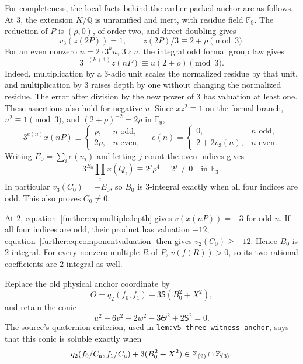 For completeness, the local facts behind the earlier packed anchor are
as follows. At $3$, the extension $K/\mathbb Q$ is unramified and inert,
with residue field $\mathbb F_9$. The reduction of $P$ is $(\rho,0)$,
of order two, and direct doubling gives
\[
 v_3(z(2P))=1,\qquad z(2P)/3\equiv2+\rho\pmod3.
\]
For an even nonzero $n=2\cdot3^ku$, $3\nmid u$, the integral odd
formal group law gives
\[
 3^{-(k+1)}z(nP)\equiv u(2+\rho)\pmod3.
\]
Indeed, multiplication by a $3$-adic unit scales the normalized residue
by that unit, and multiplication by $3$ raises depth by one without
changing the normalized residue. The error after division by the new
power of $3$ has valuation at least one. These assertions also hold for
negative $u$.
Since $xz^2\equiv1$ on the formal branch,
$u^2\equiv1\pmod3$, and $(2+\rho)^{-2}=2\rho$ in $\mathbb F_9$,
\[
 3^{e(n)}x(nP)\equiv
 \begin{cases}
 \rho,&n\text{ odd},\\
 2\rho,&n\text{ even},
 \end{cases}
 \quad
 e(n)=\begin{cases}0,&n\text{ odd},\\2+2v_3(n),&n\text{ even}.
 \end{cases}
\]
Writing $E_0=\sum_i e(n_i)$ and letting $j$ count the even indices gives
\[
 3^{E_0}\prod_i x(Q_i)\equiv2^j\rho^4=2^j\ne0
 \quad\text{in }\mathbb F_3.
\]
In particular $v_3(C_0)=-E_0$, so $B_0$ is $3$-integral exactly when
all four indices are odd. This also proves $C_0\ne0$.

At $2$, equation~\eqref{further:eq:multipledepth} gives
$v(x(nP))=-3$ for odd $n$. If all four indices are odd, their product
has valuation $-12$; equation~\eqref{further:eq:componentvaluation}
then gives $v_2(C_0)\ge-12$. Hence $B_0$ is $2$-integral.
For every nonzero multiple $R$ of $P$, $v(f(R))>0$, so its two rational
coefficients are $2$-integral as well.

Replace the old physical anchor coordinate by
\begin{equation}\label{further:eq:newtheta}
 \Theta=q_2(f_0,f_1)+3\mathsf S(B_0^2+X^2),
\end{equation}
and retain the conic
\begin{equation}\label{further:eq:anchorconic}
 u^2+6v^2-2w^2-3\Theta^2+2\mathsf S^2=0.
\end{equation}
The source's quaternion criterion, used in
\nolinkurl{lem:v5-three-witness-anchor}, says that this conic is soluble
exactly when
\begin{equation}\label{further:eq:anchortest}
 q_2(f_0/C_{\rm a},f_1/C_{\rm a})+3(B_0^2+X^2)
 \in\mathbb Z_{(2)}\cap\mathbb Z_{(3)}.
\end{equation}

